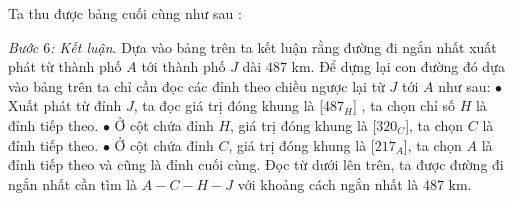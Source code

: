 \begin{multicols}{2}
	\vskip 0.1cm 
	Ta thu được bảng cuối cùng như sau :
	\begin{table}[H]
		\vspace*{-5pt}
		\centering
		\captionsetup{labelformat= empty, justification=centering}
		\vspace*{-10pt}
	\end{table} 		
	\textit{Bước $6$: Kết luận}. Dựa vào bảng trên ta kết luận rằng đường đi ngắn nhất xuất phát từ thành phố $A$ tới thành phố $J$ dài $487$ km. Để dựng lại con đường đó dựa vào bảng trên ta chỉ cần đọc các đỉnh theo chiều ngược lại từ $J$ tới $A$ như sau:
	\vskip 0.1cm
	$\bullet$ Xuất phát từ đỉnh $J$, ta đọc giá trị đóng khung là [$487_H$] , ta chọn chỉ số $H$ là đỉnh tiếp theo.
	\vskip 0.1cm
	$\bullet$ Ở cột chứa đỉnh $H$, giá trị đóng khung là [$320_C$], ta chọn $C$ là đỉnh tiếp theo.
	\vskip 0.1cm
	$\bullet$ Ở cột chứa đỉnh $C$, giá trị đóng khung là [$217_A$], ta chọn $A$ là đỉnh tiếp theo và cũng là đỉnh cuối cùng. 
	\vskip 0.1cm
	Đọc từ dưới lên trên, ta được đường đi ngắn nhất cần tìm là $A-C-H-J$ với khoảng cách ngắn nhất là $487$ km.

\end{multicols}
